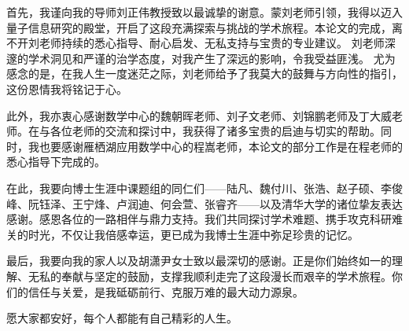 
\begin{acknowledgements}
  首先，我谨向我的导师刘正伟教授致以最诚挚的谢意。蒙刘老师引领，我得以迈入量子信息研究的殿堂，开启了这段充满探索与挑战的学术旅程。本论文的完成，离不开刘老师持续的悉心指导、耐心启发、无私支持与宝贵的专业建议。
  刘老师深邃的学术洞见和严谨的治学态度，对我产生了深远的影响，令我受益匪浅。
  尤为感念的是，在我人生一度迷茫之际，刘老师给予了我莫大的鼓舞与方向性的指引，这份恩情我将铭记于心。

此外，我亦衷心感谢数学中心的魏朝晖老师、刘子文老师、刘锦鹏老师及丁大威老师。在与各位老师的交流和探讨中，我获得了诸多宝贵的启迪与切实的帮助。同时，我也要感谢雁栖湖应用数学中心的程嵩老师，本论文的部分工作是在程老师的悉心指导下完成的。

在此，我要向博士生涯中课题组的同仁们——陆凡、魏付川、张浩、赵子硕、李俊峰、阮钰泽、王宁烽、卢润迪、何会萱、张睿齐——以及清华大学的诸位挚友表达感谢。感恩各位的一路相伴与鼎力支持。我们共同探讨学术难题、携手攻克科研难关的时光，不仅让我倍感幸运，更已成为我博士生涯中弥足珍贵的记忆。

最后，我要向我的家人以及胡潇尹女士致以最深切的感谢。正是你们始终如一的理解、无私的奉献与坚定的鼓励，支撑我顺利走完了这段漫长而艰辛的学术旅程。你们的信任与关爱，是我砥砺前行、克服万难的最大动力源泉。

愿大家都安好，每个人都能有自己精彩的人生。
\end{acknowledgements}
